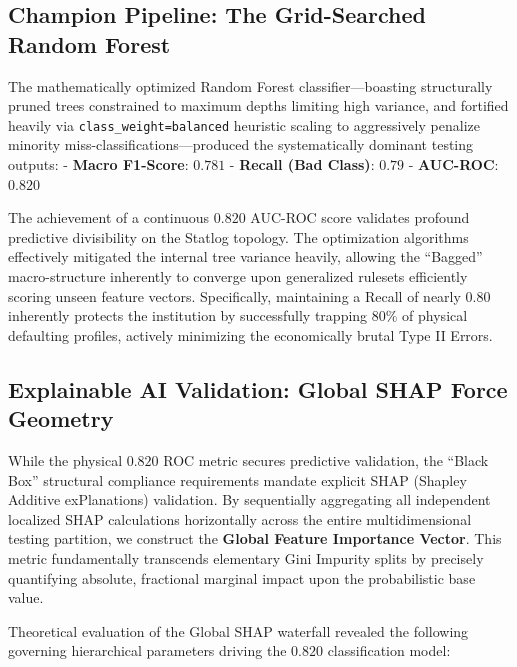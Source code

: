 \hypertarget{champion-pipeline-the-grid-searched-random-forest}{%
\subsection{Champion Pipeline: The Grid-Searched Random
Forest}\label{champion-pipeline-the-grid-searched-random-forest}}

The mathematically optimized Random Forest classifier---boasting
structurally pruned trees constrained to maximum depths limiting high
variance, and fortified heavily via
\texttt{class\_weight=\textquotesingle{}balanced\textquotesingle{}}
heuristic scaling to aggressively penalize minority
miss-classifications---produced the systematically dominant testing
outputs: - \textbf{Macro F1-Score}: \(0.781\) - \textbf{Recall (Bad
Class)}: \(0.79\) - \textbf{AUC-ROC}: \textbf{\(0.820\)}

The achievement of a continuous \(0.820\) AUC-ROC score validates
profound predictive divisibility on the Statlog topology. The
optimization algorithms effectively mitigated the internal tree variance
heavily, allowing the ``Bagged'' macro-structure inherently to converge
upon generalized rulesets efficiently scoring unseen feature vectors.
Specifically, maintaining a Recall of nearly \(0.80\) inherently
protects the institution by successfully trapping \(80\%\) of physical
defaulting profiles, actively minimizing the economically brutal Type II
Errors.

\hypertarget{explainable-ai-validation-global-shap-force-geometry}{%
\subsection{Explainable AI Validation: Global SHAP Force
Geometry}\label{explainable-ai-validation-global-shap-force-geometry}}

While the physical \(0.820\) ROC metric secures predictive validation,
the ``Black Box'' structural compliance requirements mandate explicit
SHAP (Shapley Additive exPlanations) validation. By sequentially
aggregating all independent localized SHAP calculations horizontally
across the entire multidimensional testing partition, we construct the
\textbf{Global Feature Importance Vector}. This metric fundamentally
transcends elementary Gini Impurity splits by precisely quantifying
absolute, fractional marginal impact upon the probabilistic base value.

Theoretical evaluation of the Global SHAP waterfall revealed the
following governing hierarchical parameters driving the \(0.820\)
classification model:

